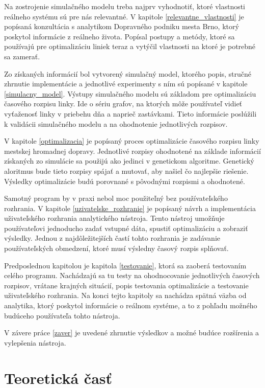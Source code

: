 Na zostrojenie simulačného modelu treba najprv vyhodnotiť, ktoré vlastnosti reálneho systému sú pre nás relevantné.
V kapitole \ref{relevantne_vlastnosti} je popísaná konzultácia s analytikom Dopravného podniku mesta Brno, ktorý poskytol informácie z reálneho života.
Popísal postupy a metódy, ktoré sa používajú pre optimalizáciu liniek teraz a vytýčil vlastnosti na ktoré je potrebné sa zamerať. 

Zo získaných informácií bol vytvorený simulačný model, ktorého popis, stručné zhrnutie implementácie a jednotlivé experimenty s ním sú popísané v kapitole \ref{simulacny_model}.
Výstupy simulačného modelu sú základom pre optimalizáciu časového rozpisu linky.
Ide o sériu grafov, na ktorých môže používateľ vidieť vyťaženosť linky v priebehu dňa a naprieč zastávkami.
Tieto informácie poslúžili k validácii simulačného modelu a na ohodnotenie jednotlivých rozpisov.

V kapitole \ref{optimalizacia} je popísaný proces optimalizácie časového rozpisu linky mestskej hromadnej dopravy.
Jednotlivé rozpisy ohodnotené na základe informácií získaných zo simulácie sa použijú ako jedinci v genetickom algoritme.
Genetický aloritmus bude tieto rozpisy spájať a mutovať, aby našiel čo najlepšie riešenie.
Výsledky optimalizácie budú porovnané s pôvodnými rozpismi a ohodnotené.

Samotný program by v praxi nebol moc použiteľný bez používateľského rozhrania.
V kapitole \ref{uzivatelske_rozhranie} je popísaný návrh a implementácia uživateľského rozhrania analytického nástroja.
Tento nástroj umožňuje používateľovi jednoducho zadať vstupné dáta, spustiť optimalizáciu a zobraziť výsledky.
Jednou z najdôležitejších častí tohto rozhrania je zadávanie používateľských obmedzení, ktoré musí výsledny časový rozpis splňovať.

Predposlednou kapitolou je kapitola \ref{testovanie}, ktorá sa zaoberá testovaním celého programu.
Nachádzajú sa tu testy na ohodnocovanie jednotlivých časových rozpisov, vrátane krajných situácií, popis testovania optimalizácie a testovanie uživateľského rozhrania.
Na konci tejto kapitoly sa nachádza spätná väzba od analytika, ktorý poskytol informácie o reálnom systéme, a to z pohľadu možného budúceho používateľa tohto nástroja.

V závere práce \ref{zaver} je uvedené zhrnutie výsledkov a možné budúce rozšírenia a vylepšenia nástroja.

\chapter{Teoretická časť} %
\label{teoreticka_cast}
